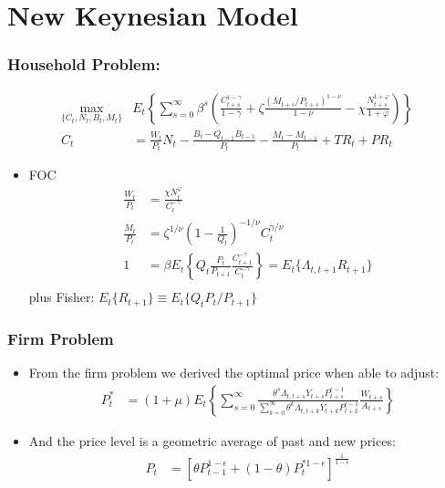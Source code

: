 \documentclass[english,xcolor=svgnames]{beamer}
\begin{document}
\section{New Keynesian Model}



\begin{frame}
\frametitle{Household Problem: }
\begin{align*}
	\max_{\{C_t,N_t,B_t,M_t\}} & E_t \left\{\sum_{s=0}^{\infty}\beta^s\left(\frac{C_{t+s}^{1-\gamma}}{1-\gamma}+\zeta\frac{(M_{t+s}/P_{t+s})^{1-\nu}}{1-\nu}-\chi \frac{N_{t+s}^{1+\varphi}}{1+\varphi}\right)\right\} \\
	C_{t}&=\frac{W_t}{P_t}N_t-\frac{B_t-Q_{t-1}B_{t-1}}{P_t}-\frac{M_t-M_{t-1}}{P_t}+TR_t+PR_t
\end{align*}
\begin{itemize}
\item FOC
\begin{align*}
	\frac{W_t}{P_t}&=\frac{\chi N_t^\varphi}{C_t^{-\gamma}} \\
	\frac{M_t}{P_t}&=\zeta^{1/\nu}\left(1-\frac{1}{Q_t}\right)^{-1/\nu}C_{t}^{\gamma/\nu}\\
	1&=\beta E_t\left\{Q_t \frac{P_t}{P_{t+1}} \frac{C_{t+1}^{-\gamma}}{C_{t}^{-\gamma}}\right\}=E_{t}\{\Lambda_{t,t+1}R_{t+1}\}\\
\end{align*}
plus Fisher: $E_{t}\{R_{t+1}\}\equiv E_{t}\{Q_tP_t/P_{t+1}\}$
\end{itemize}
\end{frame}

\begin{frame}
\frametitle{Firm Problem
}
\begin{itemize}
	\item From the firm problem we derived the optimal price when able to adjust:
	\begin{align*}
		P_t^* &=  (1+\mu)E_t\left\{\sum_{s=0}^{\infty}\frac{\theta^s\Lambda_{t,t+s}Y_{t+s}P_{t+s}^{\epsilon-1}}{\sum_{k=0}^{\infty}\theta^k\Lambda_{t,t+k}Y_{t+k}P_{t+k}^{\epsilon-1}}\frac{W_{t+s}}{A_{t+s}}\right\} 
	\end{align*}
	\item And the price level is a geometric average of past and new prices:
	\begin{align*}
		P_t&=\left[\theta P_{t-1}^{1-\epsilon} + (1-\theta) P_{t}^{*1-\epsilon}\right]^{\frac{1}{1-\epsilon}} \\
	\end{align*}
\end{itemize}
\end{frame}
\end{document}
